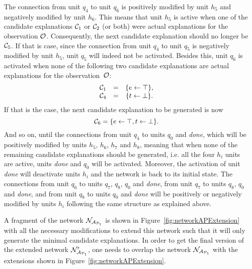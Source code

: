 The connection from unit $q_4$ to unit $q_6$ is positively modified by unit $h_5$ and negatively modified by unit $h_6$. This means that unit $h_5$ is active when one of the candidate explanations $\mathcal{C}_1$ or $\mathcal{C}_2$ (or both) were actual explanations for the observation $\mathcal{O}$. Consequently, the next candidate explanation should no longer be $\mathcal{C}_5$. If that is case, since the connection from unit $q_4$ to unit $q_5$ is negatively modified by unit $h_5$, unit $q_5$ will indeed not be activated. Besides this, unit $q_6$ is activated when none of the following two candidate explanations are actual explanations for the observation~$\mathcal{O}$:
\[
\begin{array}{ccc}
\mathcal{C}_1 &=& \{e \leftarrow \top\},\\
\mathcal{C}_4 &=& \{t \leftarrow \bot\}.
\end{array}
\]
If that is the case, the next candidate explanation to be generated is now
\[
\mathcal{C}_6 = \{e \leftarrow \top, t \leftarrow \bot\}.
\]
And so on, until the connections from unit $q_4$ to units $q_0$ and \textit{done}, which will be positively modified by units $h_5$, $h_6$, $h_7$ and $h_8$, meaning that when none of the remaining candidate explanations should be generated, i.e. all the four $h_i$ units are active, units \textit{done} and $q_0$ will be activated. Moreover, the activation of unit \textit{done} will deactivate units $h_i$ and the network is back to its initial state. The connections from unit $q_6$ to units $q_7$, $q_8$, $q_0$ and \textit{done}, from unit $q_7$ to units $q_8$, $q_0$ and \textit{done}, and from unit $q_8$ to units $q_0$ and \textit{done} will be positively or negatively modified by units $h_i$ following the same structure as explained above.

A fragment of the network $\mathcal{N}_{\mathcal{A}_{\mathcal{P}_1}}$ is shown in Figure~\ref{fig:networkAPExtension} with all the necessary modifications to extend this network such that it will only generate the minimal candidate explanations. In order to get the final version of the extended network $\mathcal{N}'_{\mathcal{A}_{\mathcal{P}_1}}$, one needs to overlap the network $\mathcal{N}_{\mathcal{A}_{\mathcal{P}_1}}$ with the extensions shown in Figure~\ref{fig:networkAPExtension}.

